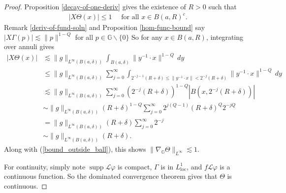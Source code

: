 \documentclass[10pt,a4paper]{amsart}
\newcommand{\G}{\mathbb{G}}
\renewcommand{\L}{\mathcal{L}}
\newcommand{\cg}{\Gamma}
\DeclareMathOperator{\supp}{supp}
\begin{document}
\begin{proof}
Proposition \ref{decay-of-one-deriv} gives the existence of $R > 0$ such that \begin{align}
    |X \Theta(x)| \leq 1 \quad \text{ for all }x \in B(a,R)^c. \label{bound_outside_ball}
\end{align} 
Remark \ref{deriv-of-fund-soln} and Proposition \ref{hom-func-bound} say $|X \cg(p)|\lesssim \| p\|^{1-Q}$ for all $p \in \G \backslash \{0\}$
So for any $x \in B(a,R)$, integrating over annuli gives \begin{align*}
    |X \Theta(x)|  &\lesssim \| g\|_{L^{\infty}(B(a,\delta))} \int_{B(a,\delta)} \| y^{-1}\cdot x\|^{1-Q}\,dy  \\ &\leq \|g\|_{L^{\infty}(B(a, \delta))} \sum_{j=0}^{\infty} \int_{ 2^{-j-1}(R+\delta) \leq \| y^{-1} \cdot x\| < 2^{-j}(R+\delta)}\| y^{-1} \cdot x\|^{1-Q}\,dy \\ &\lesssim \| g\|_{L^{\infty}(B(a,\delta))}\sum_{j=0}^{\infty} (2^{-j} (R+\delta))^{1-Q} \left| B(x, 2^{-j}(R+\delta))\right| \\ &\sim \| g\|_{L^{\infty}(B(a,\delta))} (R+\delta)^{1-Q} \sum_{j=0}^{\infty} 2^{j(Q-1)} (R+\delta)^Q 2^{-jQ} \\ &= \| g\|_{L^{\infty}(B(a,\delta))}(R+\delta) \sum_{j=0}^{\infty} 2^{-j} \\ &\sim \| g\|_{L^{\infty}(B(a,\delta))}(R+\delta).
\end{align*}
Along with (\ref{bound_outside_ball}), this shows $\| \nabla_{\G} \Theta \|_{L^{\infty}} \lesssim 1$.

For continuity, simply note $\supp \L \varphi$ is compact, $\cg$ is in $L_{\text{loc}}^1$, and $f \L \varphi$ is a continuous function. So the dominated convergence theorem gives that $\Theta$ is continuous.


\end{proof}
\end{document}
